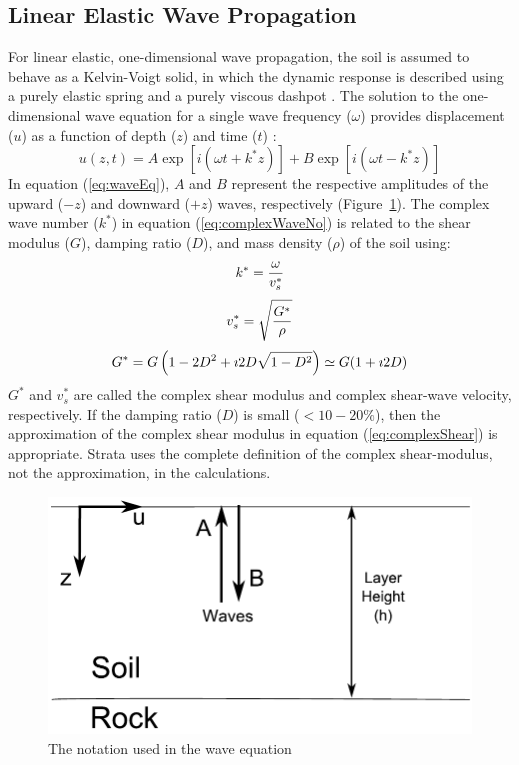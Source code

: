 \documentclass[12pt,oneside]{book}
\begin{document}
\subsection{Linear Elastic Wave Propagation}\label{ch:sra:wavePropagation}
For linear elastic, one-dimensional wave propagation, the soil is assumed to
behave as a Kelvin-Voigt solid, in which the dynamic response is described using
a purely elastic spring and a purely viscous dashpot \citep{kramer:96}.  The
solution to the one-dimensional wave equation for a single
wave frequency ($\omega$) provides displacement ($u$) as a function of depth
($z$) and time ($t$) \citep{kramer96}:
\begin{equation}
    u(z,t) = A\exp\left[i\left( \omega t + k^* z \right)\right] + B\exp\left[i\left( \omega t - k^* z
    \right)\right] 
    \label{eq:waveEq}
\end{equation}
In equation (\ref{eq:waveEq}), $A$ and $B$ represent the respective amplitudes
of the upward ($-z$) and downward ($+z$) waves, respectively
(Figure~\ref{fig:siteResponse:simpleWave}).  The complex wave number ($k^*$) in
equation (\ref{eq:complexWaveNo}) is related to the shear modulus ($G$), damping
ratio ($D$), and mass density ($\rho$) of the soil using:
\begin{equation}
    k^* = \frac{\omega}{v_s^*} \\
    \label{eq:complexWaveNo}
\end{equation}
\begin{equation}
    v_s^* = \sqrt{ \frac{G^*}{\rho} } \\
\end{equation}
\begin{equation}
    G^* = G \left( 1 - 2D^2 + \imath 2 D \sqrt{ 1 - D^2 }\right) 
    \simeq G ( 1 + \imath 2 D ) \\
    \label{eq:complexShear}
\end{equation}
$G^*$ and $v_s^*$ are called the complex shear modulus and complex shear-wave velocity, respectively.  If the damping
ratio ($D$) is small ($<10-20\%$), then the approximation of the complex shear
modulus in equation (\ref{eq:complexShear}) is appropriate.  Strata uses the
complete definition of the complex shear-modulus, not the approximation, in the
calculations.

\begin{figure}[tb]
    \begin{center}
        \includegraphics[width=0.7\linewidth]{figures/siteResponse/simpleWave.pdf}
    \end{center}
    \caption{The notation used in the wave equation}%
    \label{fig:siteResponse:simpleWave}
\end{figure}
\end{document}
